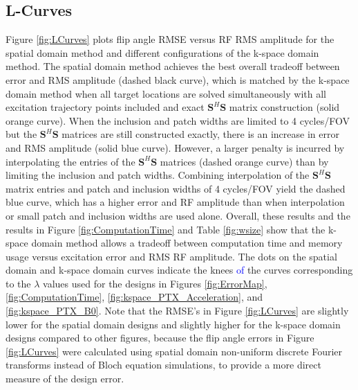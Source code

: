 \subsection*{L-Curves}
Figure \ref{fig:LCurves} plots flip angle RMSE versus RF RMS amplitude for the spatial domain method
and different configurations of the k-space domain method.
The spatial domain method achieves the best overall tradeoff between error and RMS amplitude (dashed black curve),
which is matched by the k-space domain method when all target locations are solved simultaneously with
all excitation trajectory points included and exact $\bm{S}^H\bm{S}$ matrix construction (solid orange curve). 
When the inclusion and patch widths are limited to 4 cycles/FOV but the $\bm{S}^H\bm{S}$ 
matrices are still constructed exactly, there is an increase in error and RMS amplitude (solid blue curve). 
However, a larger penalty is incurred by interpolating the entries of the $\bm{S}^H\bm{S}$ matrices (dashed orange curve)
than by limiting the inclusion and patch widths.
Combining interpolation of the $\bm{S}^H\bm{S}$ matrix entries and patch and inclusion widths of 4 cycles/FOV yield 
the dashed blue curve, which has a higher error and RF amplitude than when interpolation or small patch and inclusion widths are
used alone.
Overall, these results and the results in Figure \ref{fig:ComputationTime} and Table \ref{fig:wsize}
show that the k-space domain method allows a tradeoff between computation time and memory usage versus
excitation error and RMS RF amplitude.
The dots on the spatial domain and k-space domain curves indicate the knees \textcolor{blue}{of} the curves corresponding to
the $\lambda$ values used for the designs in Figures \ref{fig:ErrorMap}, \ref{fig:ComputationTime}, \ref{fig:kspace_PTX_Acceleration}, and \ref{fig:kspace_PTX_B0}.
Note that the RMSE's in Figure \ref{fig:LCurves} are slightly lower for the spatial domain designs
and slightly higher for the k-space domain designs compared to other figures,
because the flip angle errors in Figure \ref{fig:LCurves} were calculated using 
spatial domain non-uniform discrete Fourier transforms instead of Bloch equation simulations, 
to provide a more direct measure of the design error. 



